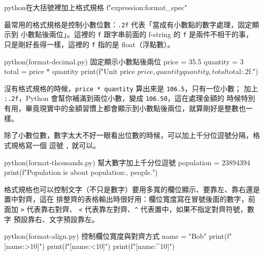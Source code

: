 \begin{code}{python}{在大括號裡加上格式規格}
f"{expression:format_spec}"
\end{code}

最常用的格式規格是控制小數位數：\texttt{.2f} 代表「當成有小數點的數字處理，固定顯示到
小數點後兩位」。這裡的 \texttt{f} 跟字串前面的 f-string 的 \texttt{f} 是兩件不相干的事，
只是剛好長得一樣，這裡的 \texttt{f} 指的是 float（浮點數）。

\begin{example}{python}{(format-decimal.py) 固定顯示小數點後兩位}
price = 35.5
quantity = 3
total = price * quantity
print(f"Unit price ${price}, quantity {quantity}, total ${total:.2f}.")
\end{example}


沒有格式規格的時候，\texttt{price * quantity} 算出來是 \texttt{106.5}，只有一位小數；
加上 \texttt{:.2f}，Python 會幫你補滿到兩位小數，變成 \texttt{106.50}，這在處理金額的
時候特別有用，畢竟現實中的金額習慣上都會顯示到小數點後兩位，就算剛好是整數也一樣。


除了小數位數，數字太大不好一眼看出位數的時候，可以加上千分位逗號分隔，格式規格寫一個
逗號 \texttt{,} 就可以。

\begin{example}{python}{(format-thousands.py) 幫大數字加上千分位逗號}
population = 23894394
print(f"Population is about {population:,} people.")
\end{example}


格式規格也可以控制文字（不只是數字）要用多寬的欄位顯示、要靠左、靠右還是置中對齊，這在
排整齊的表格輸出時很好用：欄位寬度寫在冒號後面的數字，前面加 \texttt{>} 代表靠右對齊、
\texttt{<} 代表靠左對齊、\texttt{\textasciicircum} 代表置中，如果不指定對齊符號，數字
預設靠右、文字預設靠左。

\begin{example}{python}{(format-align.py) 控制欄位寬度與對齊方式}
name = "Bob"
print(f"[{name:>10}]")
print(f"[{name:<10}]")
print(f"[{name:^10}]")
\end{example}


